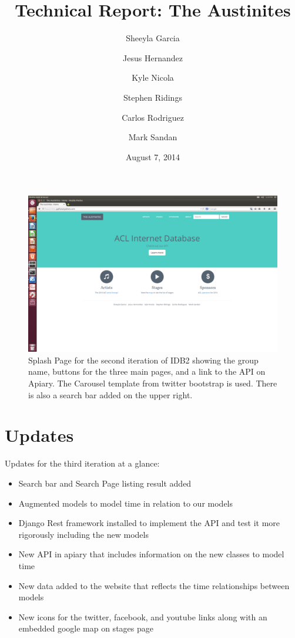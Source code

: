\documentclass[12pt,english]{scrartcl}
\title{Technical Report: The Austinites}
\author{
  Sheeyla Garcia\\
  \and
  Jesus Hernandez\\
  \and
  Kyle Nicola\\
  \and
  Stephen Ridings\\
  \and
  Carlos Rodriguez\\
  \and
  Mark Sandan\\  
}
\date{ August 7, 2014 }
\begin{document}
\thispagestyle{plain}
\maketitle
\tableofcontents

\begin{figure}[h!]
\includegraphics[width=\textwidth]{home.png}
 \caption{Splash Page for the second iteration of IDB2 showing the group name, buttons for the three main pages, and a link to the API on Apiary. The Carousel template from twitter bootstrap is used. 
          There is also a search bar added on the upper right.}
\end{figure}

\section{Updates}
Updates for the third iteration at a glance:
\begin{itemize}
 \item Search bar and Search Page listing result added
\end{itemize}
\begin{itemize}
 \item Augmented models to model time in relation to our models
\end{itemize}
\begin{itemize}
 \item Django Rest framework installed to implement the API and test it more rigorously including the new models
\end{itemize}
\begin{itemize}
 \item New API in apiary that includes information on the new classes to model time
\end{itemize}
\begin{itemize}
 \item New data added to the website that reflects the time relationships between models
\end{itemize}
\begin{itemize}
 \item New icons for the twitter, facebook, and youtube links along with an embedded google map on stages page
\end{itemize}
\end{document}
